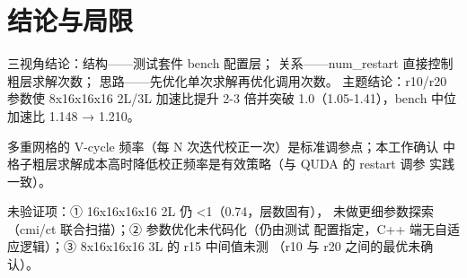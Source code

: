 \documentclass[UTF8]{ctexart}
\begin{document}
\section{结论与局限}
\begin{conclbox}
三视角结论：\textcolor{struct}{结构}——测试套件 bench 配置层；
\textcolor{relation}{关系}——num\_restart 直接控制粗层求解次数；
\textcolor{idea}{思路}——先优化单次求解再优化调用次数。
主题结论：r10/r20 参数使 8x16x16x16 2L/3L 加速比提升 2-3 倍并突破
1.0（1.05-1.41），bench 中位加速比 1.148 → 1.210。
\end{conclbox}
\begin{refbox}
多重网格的 V-cycle 频率（每 N 次迭代校正一次）是标准调参点；本工作确认
中格子粗层求解成本高时降低校正频率是有效策略（与 QUDA 的 restart 调参
实践一致）。
\end{refbox}
\begin{warnbox}
\textcolor{warn}{未验证}项：① 16x16x16x16 2L 仍 <1（0.74，层数固有），
未做更细参数探索（cmi/ct 联合扫描）；② 参数优化未代码化（仍由测试
配置指定，C++ 端无自适应逻辑）；③ 8x16x16x16 3L 的 r15 中间值未测
（r10 与 r20 之间的最优未确认）。
\end{warnbox}
\end{document}
